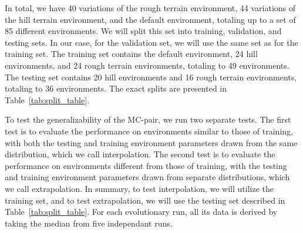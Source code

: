         In total, we have 40 variations of the rough terrain environment, 44 variations of the hill terrain environment, and the default environment, totaling up to a set of 85 different environments. We will split this set into training, validation, and testing sets. In our case, for the validation set, we will use the same set as for the training set. The training set contains the default environment, 24 hill environments, and 24 rough terrain environments, totaling to 49 environments. The testing set contains 20 hill environments and 16 rough terrain environments, totaling to 36 environments. The exact splits are presented in Table~\ref{tab:split_table}.

        To test the generalizability of the MC-pair, we run two separate tests. The first test is to evaluate the performance on environments similar to those of training, with both the testing and training environment parameters drawn from the same distribution, which we call interpolation. The second test is to evaluate the performance on environments different from those of training, with the testing and training environment parameters drawn from separate distributions, which we call extrapolation. In summary, to test interpolation, we will utilize the training set, and to test extrapolation, we will use the testing set described in Table~\ref{tab:split_table}. For each evolutionary run, all its data is derived by taking the median from five independant runs. 
